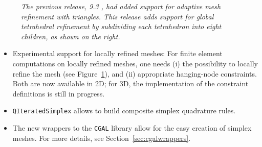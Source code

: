 \documentclass{ansarticle-preprint}
\begin{document}
\begin{figure}
  \hfill
  \phantom{.}

  \caption{\it The previous release, 9.3 \cite{dealII93}, had
    added support for adaptive mesh 
  refinement with triangles. This release adds support for global
  tetrahedral refinement by subdividing each tetrahedron into eight
  children, as shown on the right.}
  \label{fig:refinement}
\end{figure}

\begin{itemize}
\item Experimental support for locally refined meshes: For finite
  element computations on locally refined
meshes, one needs (i) the possibility to locally refine the mesh (see
Figure~\ref{fig:refinement}), and (ii) appropriate hanging-node
constraints. Both are now available in 2D; for 3D, the implementation
of the constraint definitions is still in progress.
\item \texttt{QIteratedSimplex} allows to build composite simplex quadrature rules.
\item The new wrappers to the \texttt{CGAL} library allow for the easy
  creation of simplex
meshes. For more details, see Section~\ref{sec:cgalwrappers}.
\end{itemize}
\end{document}
